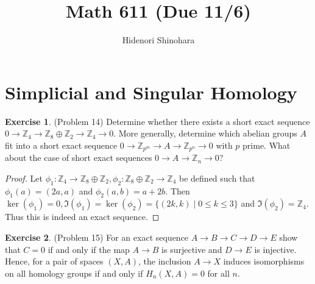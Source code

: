 \documentclass[12pt, psamsfonts]{amsart}
\theoremstyle{definition}
\newtheorem*{exer}{Exercise}
\theoremstyle{remark}
\numberwithin{equation}{section}
\begin{document}
\title{Math 611 (Due 11/6)}
\author{Hidenori Shinohara}
\maketitle

\section{Simplicial and Singular Homology}

\begin{exer}{(Problem 14)}
  Determine whether there exists a short exact sequence $0 \rightarrow \mathbb{Z}_4 \rightarrow \mathbb{Z}_8 \oplus \mathbb{Z}_2 \rightarrow \mathbb{Z}_4 \rightarrow 0$.
  More generally, determine which abelian groups $A$ fit into a short exact sequence $0 \rightarrow \mathbb{Z}_{p^m} \rightarrow A \rightarrow \mathbb{Z}_{p^n} \rightarrow 0$ with $p$ prime.
  What about the case of short exact sequences $0 \rightarrow A \rightarrow \mathbb{Z}_n \rightarrow 0$?
\end{exer}

\begin{proof}
  Let $\phi_1: \mathbb{Z}_4 \rightarrow \mathbb{Z}_8 \oplus \mathbb{Z}_2, \phi_2: \mathbb{Z}_8 \oplus \mathbb{Z}_2 \rightarrow \mathbb{Z}_4$ be defined such that $\phi_1(a) = (2a, a)$ and $\phi_2(a, b) = a + 2b$.
  Then $\ker(\phi_1) = 0, \Im(\phi_1) = \ker(\phi_2) = \{ (2k, k) \mid 0 \leq k \leq 3 \}$ and $\Im(\phi_2) = \mathbb{Z}_4$.
  Thus this is indeed an exact sequence.

\end{proof}

\begin{exer}{(Problem 15)}
  For an exact sequence $A \rightarrow B \rightarrow C \rightarrow D \rightarrow E$ show that $C = 0$ if and only if the map $A \rightarrow B$ is surjective and $D \rightarrow E$ is injective.
  Hence, for a pair of spaces $(X, A)$, the inclusion $A \rightarrow X$ induces isomorphisms on all homology groups if and only if $H_n(X, A) = 0$ for all $n$.
\end{exer}
\end{document}
